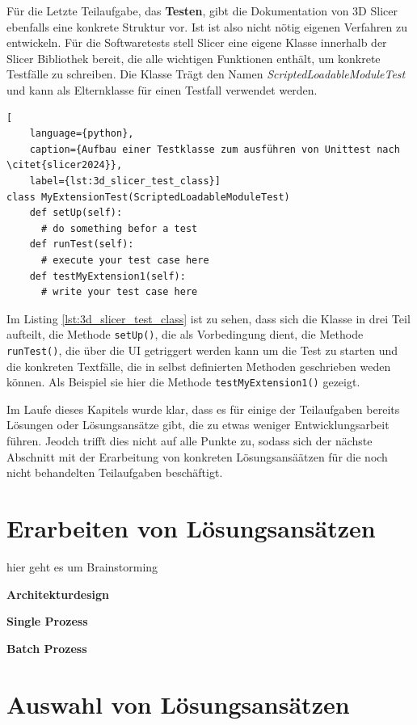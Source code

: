 Für die Letzte Teilaufgabe, das \textbf{Testen}, gibt die Dokumentation von 3D Slicer ebenfalls
eine konkrete Struktur vor. Ist ist also nicht nötig eigenen Verfahren zu
entwickeln. Für die Softwaretests stell Slicer eine eigene Klasse innerhalb der Slicer
Bibliothek bereit, die alle wichtigen Funktionen enthält, um konkrete Testfälle zu
schreiben. Die Klasse Trägt den Namen \textsl{ScriptedLoadableModuleTest} und kann
als Elternklasse für einen Testfall verwendet werden.

\begin{lstlisting}[
    language={python},
    caption={Aufbau einer Testklasse zum ausführen von Unittest nach \citet{slicer2024}},
    label={lst:3d_slicer_test_class}]
class MyExtensionTest(ScriptedLoadableModuleTest)
    def setUp(self):
      # do something befor a test
    def runTest(self):
      # execute your test case here
    def testMyExtension1(self):
      # write your test case here
\end{lstlisting}

Im Listing \ref{lst:3d_slicer_test_class} ist zu sehen, dass sich die Klasse in drei
Teil aufteilt, die Methode \texttt{setUp()}, die als Vorbedingung dient, die Methode
\texttt{runTest()}, die über die UI getriggert werden kann um die Test zu starten und
die konkreten Textfälle, die in selbst definierten Methoden geschrieben weden
können. Als Beispiel sie hier die Methode \texttt{testMyExtension1()} gezeigt.

Im Laufe dieses Kapitels wurde klar, dass es für einige der Teilaufgaben bereits Lösungen
oder Lösungsansätze gibt, die zu etwas weniger Entwicklungsarbeit führen. Jeodch trifft
dies nicht auf alle Punkte zu, sodass sich der nächste Abschnitt mit der Erarbeitung von
konkreten Lösungsansäätzen für die noch nicht behandelten Teilaufgaben beschäftigt.

\section{Erarbeiten von Lösungsansätzen}
\label{sec:lösungsansätze} hier geht es um Brainstorming

\textbf{Architekturdesign}

\textbf{Single Prozess}

\textbf{Batch Prozess}


\section{Auswahl von Lösungsansätzen}